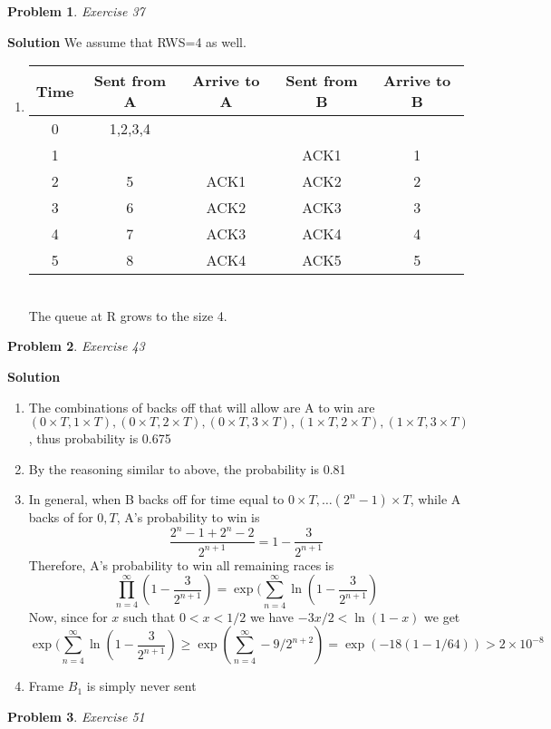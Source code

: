 \documentclass[11pt]{article} %
\newtheorem{prob}{Problem}
\newenvironment{solution}%
{\par\textbf{Solution}\space }%
{\par}
\begin{document}
\begin{prob}
	Exercise 37
\end{prob}
\begin{solution}
We assume that RWS=4 as well.
\begin{enumerate}[label=(\alph*)]
	\item{
\begin{tabular}{|c||c|c||c|c|}
	Time & Sent from A & Arrive to A & Sent from B & Arrive to B\\
	\hline
	0 & 1,2,3,4 & & & \\
	1 & & & ACK1& 1\\
	2 & 5&ACK1 & ACK2& 2\\
	3 & 6 & ACK2 & ACK3 & 3\\
	4 & 7 & ACK3 & ACK4 & 4\\
	5 & 8 & ACK4 & ACK5 & 5\\
	\hline
\end{tabular}\\
The queue at R grows to the size 4.
		}
\end{enumerate}
\end{solution}
\begin{prob}
	Exercise 43
\end{prob}
\begin{solution}
	\begin{enumerate}[label=(\alph*)]
		\item{The combinations of backs off that will allow are A to win are $(0\times T,1\times T),
(0\times T,2\times T),(0\times T,3\times T),(1\times T,2\times T),(1\times T,3\times T)
			$, thus probability is 0.675
			}
		\item{By the reasoning similar to above, the probability is 0.81
			}
		\item{In general, when B backs off for time equal to $0\times T,\dots (2^n-1)\times T$, while A backs of for $0, T$, A's probability
			to win is \[\frac{2^n-1+2^n-2}{2^{n+1}}=1-\frac{3}{2^{n+1}}\]
			Therefore, A's probability to win all remaining races is
			\[\prod_{n=4}^\infty (1-\frac{3}{2^{n+1}})=\exp(\sum_{n=4}^\infty \ln(1-\frac{3}{2^{n+1}})\]
			Now, since for $x$ such that $0<x<1/2$ we have $-3x/2<\ln(1-x)$ we get
			\[\exp(\sum_{n=4}^\infty \ln(1-\frac{3}{2^{n+1}})\geq\exp(\sum_{n=4}^\infty -9/2^{n+2})=\exp(-18(1-1/64))>2\times 10^{-8}\]
			}
		\item{Frame $B_1$ is simply never sent}
	\end{enumerate}
\end{solution}
\begin{prob}
	Exercise 51
\end{prob}
\end{document}
